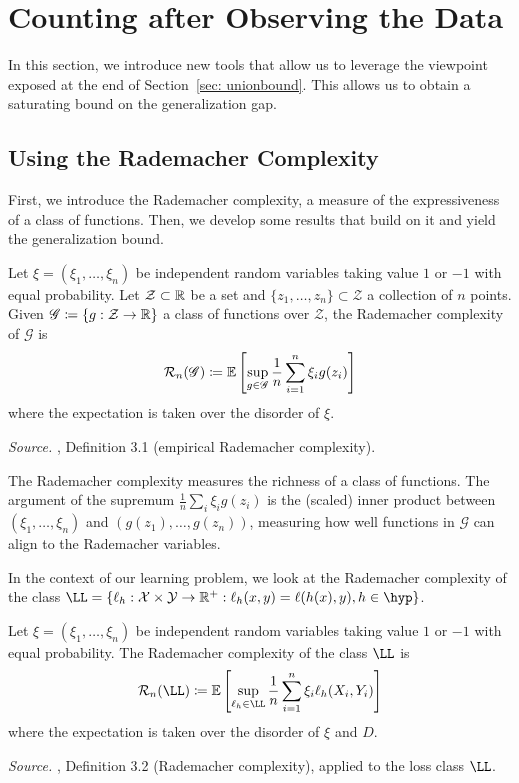 \documentclass[reqno]{amsart}
\let\oldsection\section
\renewcommand{\section}{\clearpage\thispagestyle{plain}\oldsection}
\begin{document}
\newpage

\section{Counting after Observing the Data}\label{sec: counting}
In this section, we introduce new tools that allow us to leverage the viewpoint exposed at the end of Section~\ref{sec: unionbound}. This allows us to obtain a saturating bound on the generalization gap. 

\subsection{Using the Rademacher Complexity}\label{sec: rademmassart}
First, we introduce the Rademacher complexity, a measure of the expressiveness of a class of functions. Then, we develop some results that build on it and yield the generalization bound. 

\begin{definition}\label{def: rad gen}
Let $\xi = (\xi_1,\ldots,\xi_n)$ be independent random variables taking value $1$ or $-1$ with equal probability. Let $\mathcal{Z} \subset \mathbb{R}$ be a set and $\{z_1,\ldots,z_n\}\subset \mathcal{Z}$ a collection of $n$ points. Given $\mathscr G\coloneq \{g:\mathcal{Z} \to \mathbb{R}\}$ a class of functions over $\mathcal{Z}$, the Rademacher complexity of $\mathscr G$ is
\[
\mathcal R_n(\mathscr G) \coloneq \mathbb{E} \left[\sup_{g \in \mathscr G}\frac{1}{n}\sum_{i=1}^n \xi_i g(z_i)\right]
\]
where the expectation is taken over the disorder of $\xi$. 

\textnormal{\emph{Source.} \cite{mohri2018foundations}, Definition 3.1 (empirical Rademacher complexity).}
\end{definition}

The Rademacher complexity measures the richness of a class of functions. The argument of the supremum $\frac{1}{n}\sum_i\xi_i g(z_i)$ is the (scaled) inner product between $(\xi_1,\ldots,\xi_n)$ and $(g(z_1),\ldots,g(z_n))$, measuring how well functions in $\mathscr G$ can align to the Rademacher variables.

In the context of our learning problem, we look at the Rademacher complexity of the class $\LL =  \{\ell_h:\X\times\Y\to\R^+ :\ell_h(x,y) = \ell(h(x),y), h \in \hyp \}$. 

\begin{definition}\label{def: rad}
Let $\xi = (\xi_1,\ldots,\xi_n)$ be independent random variables taking value $1$ or $-1$ with equal probability. The Rademacher complexity of the class $\LL$ is
\[
\mathcal R_n(\LL) \coloneq \expv \left[\sup_{\ell_h\in\LL}\frac{1}{n}\sum_{i=1}^n \xi_i \ell_h(X_i, Y_i)\right]
\]
where the expectation is taken over the disorder of $\xi$ and $D$. 

\textnormal{\emph{Source.} \cite{mohri2018foundations}, Definition 3.2 (Rademacher complexity), applied to the loss class $\LL$.}
\end{definition}
\end{document}
